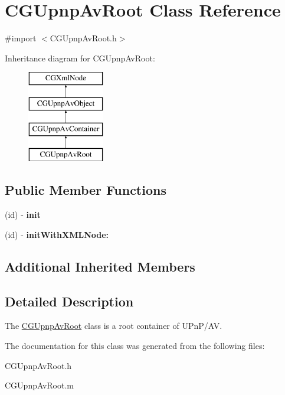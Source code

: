 \hypertarget{interface_c_g_upnp_av_root}{\section{C\-G\-Upnp\-Av\-Root Class Reference}
\label{interface_c_g_upnp_av_root}
}


{\ttfamily \#import $<$C\-G\-Upnp\-Av\-Root.\-h$>$}

Inheritance diagram for C\-G\-Upnp\-Av\-Root\-:\begin{figure}[H]
\begin{center}
\leavevmode
\includegraphics[height=4.000000cm]{interface_c_g_upnp_av_root}
\end{center}
\end{figure}
\subsection*{Public Member Functions}
\begin{DoxyCompactItemize}
\item 
\hypertarget{interface_c_g_upnp_av_root_ae52c9102a12b146e17406b5ca749a4c4}{(id) -\/ {\bfseries init}}\label{interface_c_g_upnp_av_root_ae52c9102a12b146e17406b5ca749a4c4}

\item 
\hypertarget{interface_c_g_upnp_av_root_a7ba8ce211691f73a8c7878bf0da1df81}{(id) -\/ {\bfseries init\-With\-X\-M\-L\-Node\-:}}\label{interface_c_g_upnp_av_root_a7ba8ce211691f73a8c7878bf0da1df81}

\end{DoxyCompactItemize}
\subsection*{Additional Inherited Members}


\subsection{Detailed Description}
The \hyperlink{interface_c_g_upnp_av_root}{C\-G\-Upnp\-Av\-Root} class is a root container of U\-Pn\-P/\-A\-V. 

The documentation for this class was generated from the following files\-:\begin{DoxyCompactItemize}
\item 
C\-G\-Upnp\-Av\-Root.\-h\item 
C\-G\-Upnp\-Av\-Root.\-m\end{DoxyCompactItemize}
